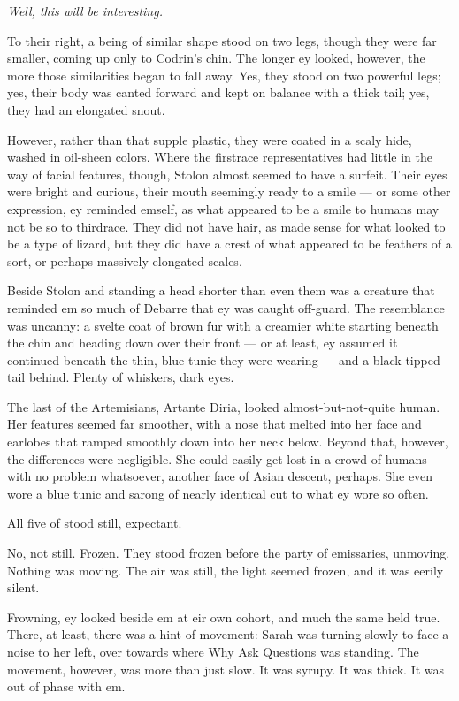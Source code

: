 \emph{Well, this will be interesting.}

To their right, a being of similar shape stood on two legs, though they were far smaller, coming up only to Codrin's chin. The longer ey looked, however, the more those similarities began to fall away. Yes, they stood on two powerful legs; yes, their body was canted forward and kept on balance with a thick tail; yes, they had an elongated snout.

However, rather than that supple plastic, they were coated in a scaly hide, washed in oil-sheen colors. Where the firstrace representatives had little in the way of facial features, though, Stolon almost seemed to have a surfeit. Their eyes were bright and curious, their mouth seemingly ready to a smile — or some other expression, ey reminded emself, as what appeared to be a smile to humans may not be so to thirdrace. They did not have hair, as made sense for what looked to be a type of lizard, but they did have a crest of what appeared to be feathers of a sort, or perhaps massively elongated scales.

Beside Stolon and standing a head shorter than even them was a creature that reminded em so much of Debarre that ey was caught off-guard. The resemblance was uncanny: a svelte coat of brown fur with a creamier white starting beneath the chin and heading down over their front — or at least, ey assumed it continued beneath the thin, blue tunic they were wearing — and a black-tipped tail behind. Plenty of whiskers, dark eyes.

The last of the Artemisians, Artante Diria, looked almost-but-not-quite human. Her features seemed far smoother, with a nose that melted into her face and earlobes that ramped smoothly down into her neck below. Beyond that, however, the differences were negligible. She could easily get lost in a crowd of humans with no problem whatsoever, another face of Asian descent, perhaps. She even wore a blue tunic and sarong of nearly identical cut to what ey wore so often.

All five of stood still, expectant.

No, not still. Frozen. They stood frozen before the party of emissaries, unmoving. Nothing was moving. The air was still, the light seemed frozen, and it was eerily silent.

Frowning, ey looked beside em at eir own cohort, and much the same held true. There, at least, there was a hint of movement: Sarah was turning slowly to face a noise to her left, over towards where Why Ask Questions was standing. The movement, however, was more than just slow. It was syrupy. It was thick. It was out of phase with em.

